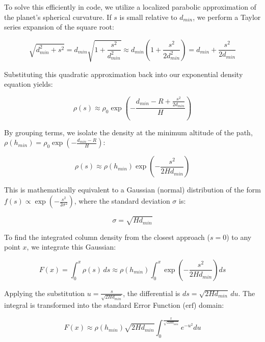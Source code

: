 ﻿\documentclass[12pt,a4paper]{article}
\begin{document}
To solve this efficiently in code, we utilize a localized parabolic approximation of the planet's spherical curvature. If $s$ is small relative to $d_{min}$, we perform a Taylor series expansion of the square root:

\begin{equation}
\sqrt{d_{min}^2 + s^2} = d_{min} \sqrt{1 + \frac{s^2}{d_{min}^2}} \approx d_{min} \left(1 + \frac{s^2}{2d_{min}^2}\right) = d_{min} + \frac{s^2}{2d_{min}}
\end{equation}

Substituting this quadratic approximation back into our exponential density equation yields:

\begin{equation}
\rho(s) \approx \rho_0 \exp\left( -\frac{d_{min} - R + \frac{s^2}{2d_{min}}}{H} \right)
\end{equation}

By grouping terms, we isolate the density at the minimum altitude of the path, $\rho(h_{min}) = \rho_0 \exp\left(-\frac{d_{min} - R}{H}\right)$:

\begin{equation}
\rho(s) \approx \rho(h_{min}) \exp\left( -\frac{s^2}{2H d_{min}} \right)
\end{equation}

This is mathematically equivalent to a Gaussian (normal) distribution of the form $f(s) \propto \exp\left(-\frac{s^2}{2\sigma^2}\right)$, where the standard deviation $\sigma$ is:

\begin{equation}
\sigma = \sqrt{H d_{min}}
\end{equation}

To find the integrated column density from the closest approach ($s=0$) to any point $x$, we integrate this Gaussian:

\begin{equation}
F(x) = \int_{0}^{x} \rho(s) \, ds \approx \rho(h_{min}) \int_{0}^{x} \exp\left( -\frac{s^2}{2H d_{min}} \right) ds
\end{equation}

Applying the substitution $u = \frac{s}{\sqrt{2H d_{min}}}$, the differential is $ds = \sqrt{2H d_{min}} \, du$. The integral is transformed into the standard Error Function ($\text{erf}$) domain:

\begin{equation}
F(x) \approx \rho(h_{min}) \sqrt{2H d_{min}} \int_{0}^{\frac{x}{\sqrt{2H d_{min}}}} e^{-u^2} du
\end{equation}
\end{document}
